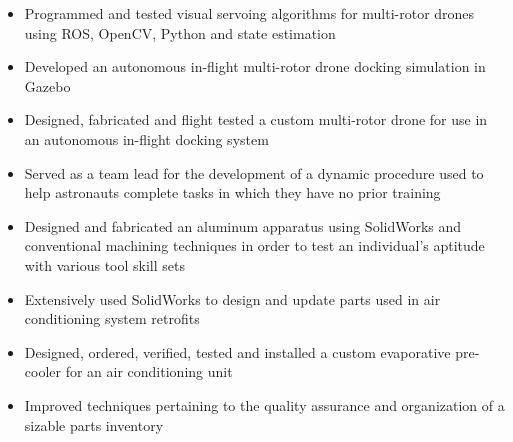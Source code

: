 \documentclass[10pt,a4paper,ragged2e]{altacv}
\begin{document}

\begin{fullwidth}
  \makecvheader
\end{fullwidth}



\begin{itemize}
  \item Programmed and tested visual servoing algorithms for multi-rotor drones using ROS, OpenCV, Python and state estimation
  \item Developed an autonomous in-flight multi-rotor drone docking simulation in Gazebo
  \item Designed, fabricated and flight tested a custom multi-rotor drone for use in an autonomous in-flight docking system 
\end{itemize}

\begin{itemize}
  \item Served as a team lead for the development of a dynamic procedure used to help astronauts complete tasks in which they have no prior training 
  \item Designed and fabricated an aluminum apparatus using SolidWorks and conventional machining techniques in order to test an individual’s aptitude with various tool skill sets
\end{itemize}

\divider

\begin{itemize}
  \item Extensively used SolidWorks to design and update parts used in air conditioning system retrofits
  \item Designed, ordered, verified, tested and installed a custom evaporative pre-cooler for an air conditioning unit
  \item Improved techniques pertaining to the quality assurance and organization of a sizable parts inventory
\end{itemize}
\end{document}
